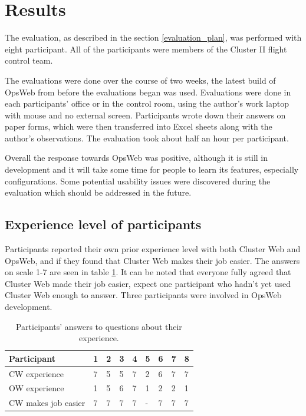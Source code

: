 \section{Results}
The evaluation, as described in the section \ref{evaluation_plan}, was performed with eight participant. All of the participants were members of the Cluster II flight control team.

The evaluations were done over the course of two weeks, the latest build of OpsWeb from before the evaluations began was used. Evaluations were done in each participants' office or in the control room, using the author's work laptop with mouse and no external screen. Participants wrote down their answers on paper forms, which were then transferred into Excel sheets along with the author's observations. The evaluation took about half an hour per participant.

Overall the response towards OpsWeb was positive, although it is still in development and it will take some time for people to learn its features, especially configurations. Some potential usability issues were discovered during the evaluation which should be addressed in the future.

\subsection{Experience level of participants}
Participants reported their own prior experience level with both Cluster Web and OpsWeb, and if they found that Cluster Web makes their job easier. The answers on scale 1-7 are seen in table \ref{experience_levels}. It can be noted that everyone fully agreed that Cluster Web made their job easier, expect one participant who hadn't yet used Cluster Web enough to answer. Three participants were involved in OpsWeb development.

\begin{table}[!ht]
\def\arraystretch{1.1}%
    \begin{center}
    \caption{Participants' answers to questions about their experience.}
    \label{experience_levels}
    \begin{tabular}{| l | l | l | l | l | l | l | l | l | }
    \hline
    Participant & 1 & 2 & 3 & 4 & 5 & 6 & 7 & 8   \\
    \hline
    CW experience    & 7  & 5 & 5 & 7 & 2 & 6 & 7 & 7     \\
    OW experience    & 1 & 5 & 6 & 7 & 1 & 2 & 2 & 1  \\
    CW makes job easier & 7 & 7 & 7 & 7 & - & 7 & 7 & 7    \\
    \hline
    \end{tabular}
    \end{center}
\end{table}

